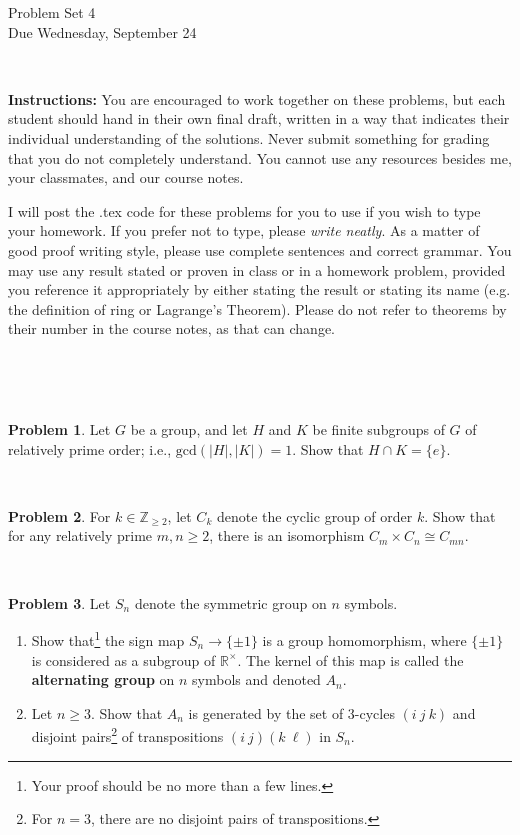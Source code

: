 \documentclass[11pt]{article}
\title{}
\date{\vspace{-0.5in}}
\theoremstyle{definition}
\newtheorem{problem}{Problem}
\begin{document}
\thispagestyle{fancy}
\pagestyle{fancy}

\vspace{3em}

\begin{center}
	{\LARGE Problem Set 4 \\}
	Due Wednesday, September 24
\end{center}

\

\noindent
{\bf Instructions:}
You are encouraged to work together on these problems, but each student should hand in their own final draft, written in a way that indicates their individual understanding of the solutions. Never submit something for grading that you do not completely understand. You cannot use any resources besides me, your classmates, and our course notes.


I will post the .tex code for these problems for you to use if you wish to type your homework. If you prefer not to type, please  {\em write neatly}. As a matter of good proof writing style, please use complete sentences and correct grammar. You may use any result stated or proven in class or in a homework problem, provided you reference it appropriately by either stating the result or stating its name (e.g. the definition of ring or Lagrange's Theorem). Please do not refer to theorems by their number in the course notes, as that can change.


\




\

\begin{problem} 
Let $G$ be a group, and let $H$ and $K$ be finite subgroups of $G$ of relatively prime order; i.e., $\mathrm{gcd}(|H|, |K|) = 1$. Show that $H \cap K = \{e\}$.
\end{problem} 

\


\begin{problem} 
For $k\in \mathbb{Z}_{\geq 2}$, let $C_k$ denote the cyclic group of order $k$. Show that for any relatively prime $m,n\geq 2$, there is an isomorphism $C_m \times C_n \cong C_{mn}$.
\end{problem} 

\


\begin{problem} 
Let $S_n$ denote the symmetric group on $n$ symbols.
\begin{enumerate}[(3.1)]
\item Show that\footnote{Your proof should be no more than a few lines.} the sign map $S_n \to \{\pm 1\}$ is a group homomorphism, where $\{\pm 1\}$ is considered as a subgroup of $\mathbb{R}^\times$. The kernel of this map is called the \textbf{alternating group} on $n$ symbols and denoted $A_n$.
\item Let $n\geq 3$. Show that $A_n$ is generated by the set of $3$-cycles $(i \ j\ k)$ and disjoint pairs\footnote{For $n=3$, there are no disjoint pairs of transpositions.} of transpositions $(i \ j) (k \ \ell)$ in $S_n$. 
\end{enumerate}
\end{problem} 
\end{document}
